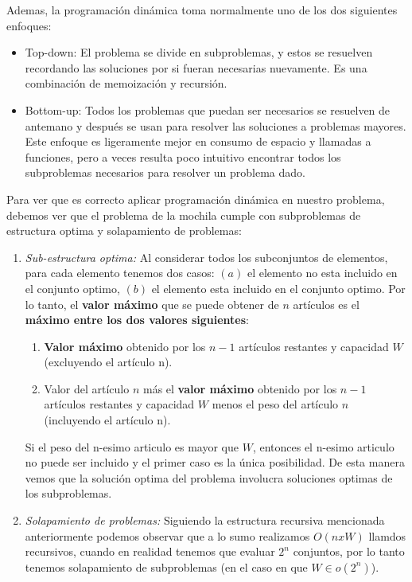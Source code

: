 Ademas, la programación dinámica toma normalmente uno de los dos siguientes enfoques:
\begin{itemize}
	\item Top-down: El problema se divide en subproblemas, y estos se resuelven recordando las soluciones por si fueran necesarias nuevamente. Es una combinación de memoización y recursión.
	\item Bottom-up: Todos los problemas que puedan ser necesarios se resuelven de antemano y después se usan para resolver las soluciones a problemas mayores. Este enfoque es ligeramente mejor en consumo de espacio y llamadas a funciones, pero a veces resulta poco intuitivo encontrar todos los subproblemas necesarios para resolver un problema dado.
\end{itemize}

Para ver que es correcto aplicar programación dinámica en nuestro problema, debemos ver que el problema de la mochila cumple con subproblemas de estructura optima y solapamiento de problemas:
\begin{enumerate}
	\item \textit{Sub-estructura optima:} Al considerar todos los subconjuntos de elementos, para cada elemento tenemos dos casos: $(a)$ el elemento no esta incluido en el conjunto optimo, $(b)$ el elemento esta incluido en el conjunto optimo.
	Por lo tanto, el \textbf{valor máximo} que se puede obtener de $n$ artículos es el \textbf{máximo entre los dos valores siguientes}:
	\begin{enumerate}
		\item \textbf{Valor máximo} obtenido por los $n-1$ artículos restantes y capacidad $W$ (excluyendo el artículo n).
		\item Valor del artículo $n$ más el \textbf{valor máximo} obtenido por los $n-1$ artículos restantes y capacidad $W$ menos el peso del artículo $n$ (incluyendo el artículo n).
	\end{enumerate}
	Si el peso del n-esimo articulo es mayor que $W$, entonces el n-esimo articulo no puede ser incluido y el primer caso es la única posibilidad.
	De esta manera vemos que la solución optima del problema involucra soluciones optimas de los subproblemas.
	
	\item \textit{Solapamiento de problemas:} Siguiendo la estructura recursiva mencionada anteriormente podemos observar que a lo sumo realizamos $O(nxW)$ llamdos recursivos, cuando en realidad tenemos que evaluar $2^{n}$ conjuntos, por lo tanto tenemos solapamiento de subproblemas (en el caso en que $W \in o(2^{n})$).

\end{enumerate}


